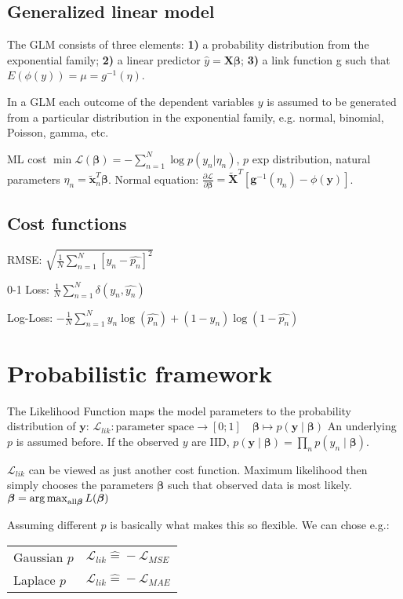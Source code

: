\documentclass[10pt,a4paper,landscape]{extarticle}
\renewcommand{\bf}[1]{\ensuremath{\mathbf{#1}}}
\newcommand{\bbeta}{\boldsymbol\beta}
\begin{document}
\begin{multicols*}{4}
\subsection{Generalized linear model}
The GLM consists of three elements: \textbf{1)} a probability distribution from the exponential family; \textbf{2)} a linear predictor $\hat y = \bf{X} \bbeta$; \textbf{3)} a link function g such that $E(\phi(y)) = \mu = g^{-1}(\eta)$.

In a GLM each outcome of the dependent variables $y$ is assumed to be generated from a particular distribution in the exponential family, e.g. normal, binomial, Poisson, gamma, etc.

ML cost $\min \mathcal{L}(\bbeta) = - \sum_{n=1}^N \log p(y_n | \eta_n)$, $p$ exp distribution, natural parameters $\eta_n = \tilde{\bf{x}}_n^T \bbeta$. Normal equation: $\frac{\partial \mathcal{L}}{\partial \bbeta} = \tilde{\bf{X}}^T [ \bf{g}^{-1}(\eta_n) - \phi(\bf{y})]$.


\subsection{Cost functions}
RMSE: $\sqrt{\frac{1}{N} \sum_{n=1}^{N}\left[y_n- \hat{p_n} \right]^2}$

0-1 Loss: $ \frac{1}{N} \sum_{n=1}^{N} \delta(y_n, \hat{y_n})$

Log-Loss: $- \frac{1}{N}  \sum_{n=1}^{N} y_n \log(\hat{p_n}) + (1-y_n) \log(1-\hat{p_n})$


\section{Probabilistic framework}
The Likelihood Function maps the model parameters to the probability distribution of $\bf{y}$:
$\mathcal{L}_{lik}\colon \text{parameter space} \to [0;1]\quad  \bbeta \mapsto p(\bf{y} \mid  \bbeta)$
An underlying $p$ is assumed before. If the observed $y$ are IID, $p(\bf{y} \mid \bbeta) = \prod_n p(y_n \mid \bbeta)$.

$\mathcal{L}_{lik}$ can be viewed as just another cost function. Maximum likelihood then simply chooses the parameters $\bbeta$ such that observed data is most likely. $\bbeta = \argmax_{\text{all} \bbeta} L(\bbeta)$

Assuming different $p$ is basically what makes this so flexible. We can chose e.g.:

\begin{tabular}{ l  l }
  \hline
  Gaussian $p$ & $\mathcal{L}_{lik} \widehat{=} -\mathcal{L}_{MSE}$ \\
  Laplace $p$  & $\mathcal{L}_{lik} \widehat{=} -\mathcal{L}_{MAE}$ \\
  \hline
\end{tabular}


\end{multicols*}
\end{document}
